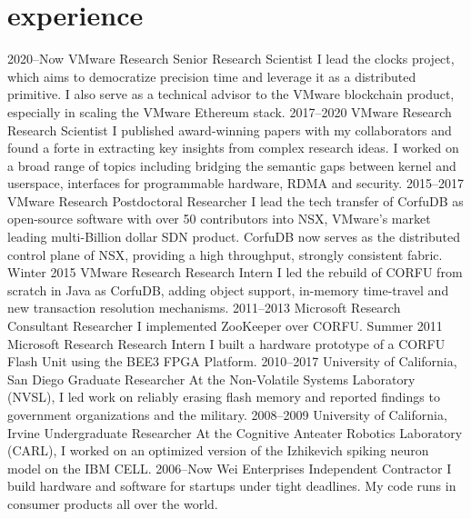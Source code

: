 \section{experience}

\begin{entrylist}
\entry
{2020--Now}
{VMware Research}
{Senior Research Scientist}
{\small I lead the clocks project, which aims to democratize precision time and leverage it as a distributed primitive.
I also serve as a technical advisor to the VMware blockchain product, especially in scaling the VMware Ethereum stack.}
\entry
{2017--2020}
{VMware Research}
{Research Scientist}
{\small I published award-winning papers with my collaborators and found a forte in extracting 
 key insights from complex research ideas. I worked on a broad range of topics including
 bridging the semantic gaps between kernel and userspace, interfaces for programmable hardware, 
 RDMA and security. }
\entry
{2015--2017}
{VMware Research}
{Postdoctoral Researcher}
{\small I lead the tech transfer of CorfuDB as open-source software with over 50 contributors into NSX, VMware's market leading multi-Billion dollar SDN product. 
CorfuDB now serves as the distributed control plane of NSX, providing a high throughput, strongly consistent fabric.}
\entry
{Winter 2015}
{VMware Research}
{Research Intern}
{\small I led the rebuild of CORFU from scratch in Java as CorfuDB, adding object support, in-memory time-travel and new transaction resolution mechanisms.}
\entry
{2011--2013}
{Microsoft Research}
{Consultant Researcher}
{\small I implemented ZooKeeper over CORFU.}
\entry
{Summer 2011}
{Microsoft Research}
{Research Intern}
{\small I built a hardware prototype of a CORFU Flash Unit using the BEE3 FPGA Platform.}
\entry
{2010--2017}
{University of California, San Diego}
{Graduate Researcher}
{\small At the Non-Volatile Systems Laboratory (NVSL), I led work on reliably erasing flash memory and reported findings to government organizations and the military.}
\entry
{2008--2009}
{University of California, Irvine}
{Undergraduate Researcher}
{\small At the Cognitive Anteater Robotics Laboratory (CARL), I worked on an optimized version of the Izhikevich spiking neuron model on the IBM CELL.}
\entry
{2006--Now}
{Wei Enterprises}
{Independent Contractor}
{\small I build hardware and software for startups under tight deadlines. My code runs in consumer products all over the world.}
\end{entrylist}
